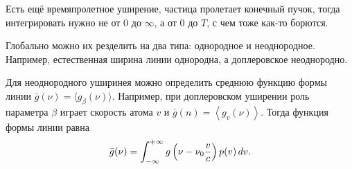 Есть ещё времяпролетное уширение, частица пролетает конечный пучок, тогда интегрировать нужно не от $0$ до $\infty$, а от $0$ до $T$, с чем тоже как-то борются.

Глобально можно их резделить на два типа: однородное и неоднородное. Например, естественная ширина линии однородна, а доплеровское неоднородно. 

Для  неоднородного уширинея можно определить среднюю функцию формы линии $\bar{g}(\nu) = \langle g_\beta (\nu)\rangle$. Например, при доплеровском уширении роль параметра $\beta$ играет скорость атома $v$  и $\bar{g} (n) = \left\langle g_v (\nu)\right\rangle$. Тогда функция формы линии равна
\begin{equation*}
    \bar{g} (\nu) = \int_{-\infty}^{+\infty} g\left(
        \nu - \nu_0 \frac{v}{c}
    \right) p(v) \, d v.
\end{equation*}

